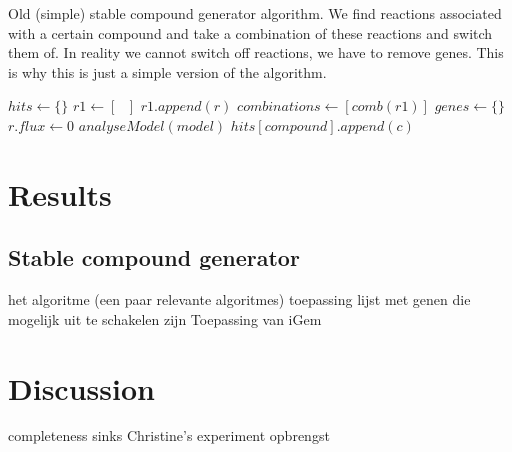 \documentclass[10pt]{report}
\begin{document}
\begin{algorithm}
  \caption{Old (simple) stable compound generator algorithm. We find reactions associated with a certain compound and take a combination of these reactions and switch them of. In reality we cannot switch off reactions, we have to remove genes. This is why this is just a simple version of the algorithm.}\label{alg:scg_old}
  \begin{algorithmic}[1]
        \State $hits \gets \text{\{ \}}$
        \State $r1 \gets [\text{ }]$ 
                \State $r1.append(r)$
            \EndIf
        \EndFor
            \State $combinations \gets [comb(r1)]$
            \State $genes \gets \text{\{ \}}$
                    \State $r.flux \gets 0$
                \EndFor
                \State $analyseModel(model)$
                        \State $hits[compound].append(c)$
                    \EndIf
                \EndIf
            \EndFor
        \EndIf
    \EndProcedure
  \end{algorithmic}
\end{algorithm}



\section{Results}
\subsection{Stable compound generator}
het algoritme (een paar relevante algoritmes)
toepassing lijst met genen die mogelijk uit te schakelen zijn
Toepassing van iGem

\section{Discussion}
completeness
sinks
Christine's experiment
opbrengst
\end{document}
